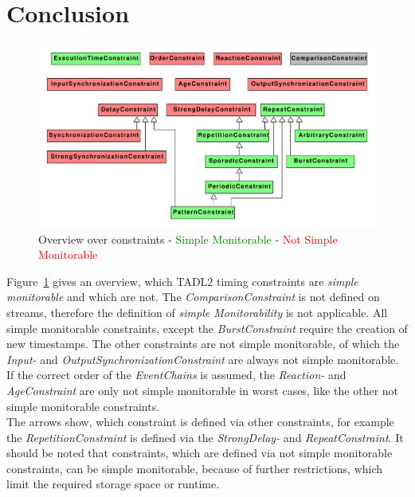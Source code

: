 \section{Conclusion}
	

\begin{figure}
	\centering
	\includegraphics[width=\linewidth]{relationBetweenConstraint}
	\caption{Overview over constraints - \textcolor{green}{Simple Monitorable} - \textcolor{red}{Not Simple Monitorable}}
	\label{fig:relationbetweenconstraint}
\end{figure}
Figure~\ref{fig:relationbetweenconstraint} gives an overview, which TADL2 timing constraints are \textit{simple monitorable} and which are not. The \textit{ComparisonConstraint} is not defined on streams, therefore the definition of \textit{simple Monitorability} is not applicable. All simple monitorable constraints, except the \textit{BurstConstraint} require the creation of new timestamps. The other constraints are not simple monitorable, of which the \emph{Input-} and \emph{OutputSynchronizationConstraint} are always not simple monitorable. If the correct order of the \textit{EventChains} is assumed, the \textit{Reaction-} and \textit{AgeConstraint} are only not simple monitorable in worst cases, like the other not simple monitorable constraints.\\
The arrows show, which constraint is defined via other constraints, for example the \emph{RepetitionConstraint} is defined via the \emph{StrongDelay-} and \emph{RepeatConstraint}. It should be noted that constraints, which are defined via not simple monitorable constraints, can be simple monitorable, because of further restrictions, which limit the required storage space or runtime.

